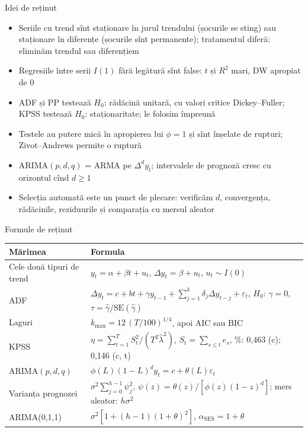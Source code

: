 \begin{frame}{Idei de reținut}
\itemsize{\small}
\begin{itemize}
    \item Seriile cu trend sînt staționare în jurul trendului (șocurile se sting) sau staționare în diferențe (șocurile sînt permanente); tratamentul diferă: eliminăm trendul sau diferențiem
    \item Regresiile între serii $I(1)$ fără legătură sînt false: $t$ și $R^2$ mari, DW apropiat de 0
    \item ADF și PP testează $H_0$: rădăcină unitară, cu valori critice Dickey--Fuller; KPSS testează $H_0$: staționaritate; le folosim împreună
    \item Testele au putere mică în apropierea lui $\phi = 1$ și sînt înșelate de rupturi; Zivot--Andrews permite o ruptură
    \item ARIMA$(p,d,q)$ = ARMA pe $\Delta^d y_t$; intervalele de prognoză cresc cu orizontul cînd $d \ge 1$
    \item Selecția automată este un punct de plecare: verificăm $d$, convergența, rădăcinile, reziduurile și comparația cu mersul aleator
\end{itemize}
\end{frame}

\begin{frame}{Formule de reținut}
\itemsize{\small}
{\renewcommand{\arraystretch}{1.4}\begin{center}
\scriptsize
\begin{tabular}{ll}
\toprule
\textbf{Mărimea} & \textbf{Formula} \\
\midrule
Cele două tipuri de trend & $y_t = \alpha + \beta t + u_t$, \quad $\Delta y_t = \beta + u_t$, \quad $u_t \sim I(0)$ \\
ADF & $\Delta y_t = c + bt + \gamma y_{t-1} + \sum_{j=1}^{k}\delta_j\Delta y_{t-j} + \varepsilon_t$, \quad $H_0$: $\gamma = 0$, \quad $\tau = \hat\gamma/\mathrm{SE}(\hat\gamma)$ \\
Laguri & $k_{\max} = 12\,(T/100)^{1/4}$, apoi AIC sau BIC \\
KPSS & $\eta = \sum_{t=1}^{T} S_t^2/(T^2\hat\lambda^2)$, \quad $S_t = \sum_{s \le t} e_s$, \quad 5\%: 0,463 (c); 0,146 (c, t) \\
ARIMA$(p,d,q)$ & $\phi(L)(1 - L)^d y_t = c + \theta(L)\varepsilon_t$ \\
Varianța prognozei & $\sigma^2\sum_{j=0}^{h-1}\psi_j^2$, \quad $\psi(z) = \theta(z)/[\phi(z)(1 - z)^d]$; mers aleator: $h\sigma^2$ \\
ARIMA(0,1,1) & $\sigma^2[1 + (h - 1)(1 + \theta)^2]$, \quad $\alpha_{\mathrm{SES}} = 1 + \theta$ \\
\bottomrule
\end{tabular}
\end{center}
}
\end{frame}


